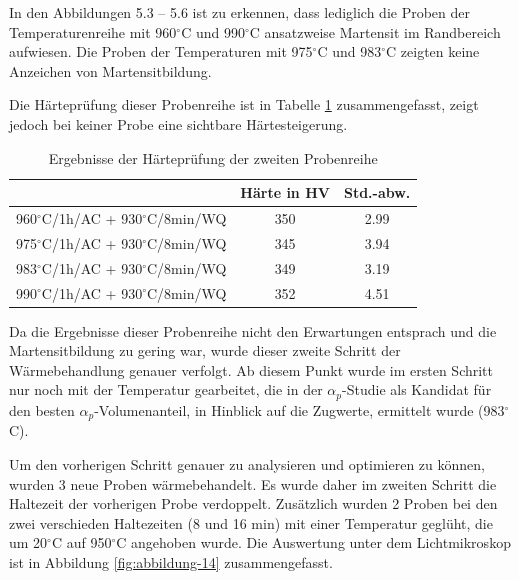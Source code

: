 In den Abbildungen 5.3 -- 5.6 ist zu erkennen, dass lediglich die Proben der Temperaturenreihe mit 960$^\circ$C und 990$^\circ$C ansatzweise Martensit im Randbereich aufwiesen. Die Proben der Temperaturen mit 975$^\circ$C und 983$^\circ$C zeigten keine Anzeichen von Martensitbildung.

Die Härteprüfung dieser Probenreihe ist in Tabelle \ref{Tabelle 6} zusammengefasst, zeigt jedoch bei keiner Probe eine sichtbare Härtesteigerung.

\begin{table}[h]
	\centering
	\begin{tabular}{|c|c|c|}
		\hline 
		& Härte in HV &  Std.-abw. \\ 
		\hline 
		960$^\circ$C/1h/AC + 930$^\circ$C/8min/WQ & 350 & 2.99 \\ 
		\hline 
		975$^\circ$C/1h/AC + 930$^\circ$C/8min/WQ & 345 & 3.94 \\ 
		\hline 
		983$^\circ$C/1h/AC + 930$^\circ$C/8min/WQ & 349 & 3.19 \\ 
		\hline 
		990$^\circ$C/1h/AC + 930$^\circ$C/8min/WQ & 352 & 4.51 \\ 
		\hline 
    \end{tabular} 
	\caption{Ergebnisse der Härteprüfung der zweiten Probenreihe}
	\label{Tabelle 6}
\end{table}

Da die Ergebnisse dieser Probenreihe nicht den Erwartungen entsprach und die Martensitbildung zu gering war, wurde dieser zweite Schritt der Wärmebehandlung genauer verfolgt. Ab diesem Punkt wurde im ersten Schritt nur noch mit der Temperatur gearbeitet, die in der $\alpha_p$-Studie als Kandidat für den besten $\alpha_p$-Volumenanteil, in Hinblick auf die Zugwerte, ermittelt wurde (983$^\circ$C). 

Um den vorherigen Schritt genauer zu analysieren und optimieren zu können, wurden 3 neue Proben wärmebehandelt. Es wurde daher im zweiten Schritt die Haltezeit der vorherigen Probe verdoppelt. Zusätzlich wurden 2 Proben bei den zwei verschieden Haltezeiten (8 und 16 min) mit einer Temperatur geglüht, die um 20$^\circ$C auf 950$^\circ$C angehoben wurde. Die Auswertung unter dem Lichtmikroskop ist in Abbildung \ref{fig:abbildung-14} zusammengefasst. 

